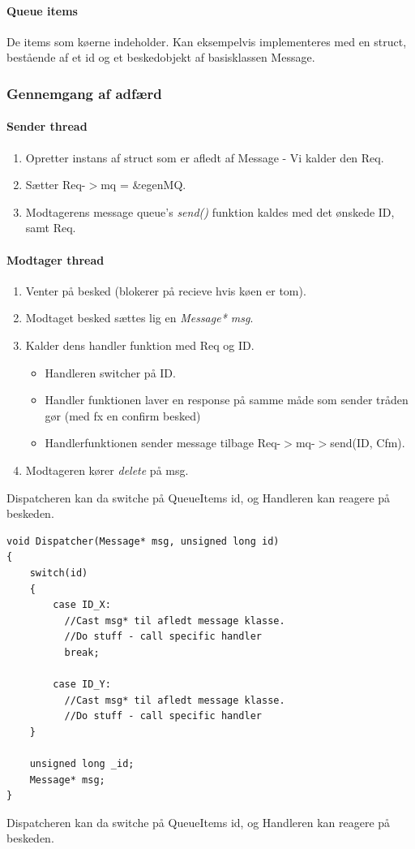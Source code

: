 \paragraph{Queue items}
De items som køerne indeholder. Kan eksempelvis implementeres med en struct, bestående af et id og et beskedobjekt af basisklassen Message.

\subsubsection{Gennemgang af adfærd}

\paragraph{Sender thread}
\begin{enumerate}
	\item Opretter instans af struct som er afledt af Message - Vi kalder den Req.
	\item Sætter Req-$>$mq = \&egenMQ.
	\item Modtagerens message queue's \textit{send()} funktion kaldes med det ønskede ID, samt Req.
\end{enumerate}

\paragraph{Modtager thread}
\begin{enumerate}
	\item Venter på besked (blokerer på recieve hvis køen er tom).
	\item Modtaget besked sættes lig en \textit{Message* msg}.
	\item Kalder dens handler funktion med Req og ID.
	\begin{itemize}
		\item Handleren switcher på ID.
		\item Handler funktionen laver en response på samme måde som sender tråden gør (med fx en confirm besked)
		\item Handlerfunktionen sender message tilbage Req-$>$mq-$>$send(ID, Cfm). 
	\end{itemize}
	\item Modtageren kører \textit{delete} på msg.
\end{enumerate}


Dispatcheren kan da switche på QueueItems id, og Handleren kan  reagere på beskeden.

\begin{lstlisting}[caption=Dispatcher]
void Dispatcher(Message* msg, unsigned long id)
{
	switch(id)
	{
		case ID_X:
		  //Cast msg* til afledt message klasse.
		  //Do stuff - call specific handler
		  break;
		
		case ID_Y:
		  //Cast msg* til afledt message klasse.
		  //Do stuff - call specific handler
	}
	
	unsigned long _id;
	Message* msg;
}
\end{lstlisting}
Dispatcheren kan da switche på QueueItems id, og Handleren kan  reagere på beskeden.

